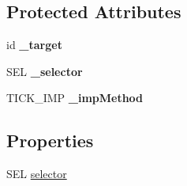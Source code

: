 \subsection*{Protected Attributes}
\begin{DoxyCompactItemize}
\item 
\hypertarget{interface_c_c_timer_target_selector_ad96cdf2fce395baef576a6b6d033f3f8}{id {\bfseries \-\_\-target}}\label{interface_c_c_timer_target_selector_ad96cdf2fce395baef576a6b6d033f3f8}

\item 
\hypertarget{interface_c_c_timer_target_selector_a9ae5a87769dd0d1e93f80404098da53e}{S\-E\-L {\bfseries \-\_\-selector}}\label{interface_c_c_timer_target_selector_a9ae5a87769dd0d1e93f80404098da53e}

\item 
\hypertarget{interface_c_c_timer_target_selector_a448237d83f297f2f808e3ebb805fdce0}{T\-I\-C\-K\-\_\-\-I\-M\-P {\bfseries \-\_\-imp\-Method}}\label{interface_c_c_timer_target_selector_a448237d83f297f2f808e3ebb805fdce0}

\end{DoxyCompactItemize}
\subsection*{Properties}
\begin{DoxyCompactItemize}
\item 
S\-E\-L \hyperlink{interface_c_c_timer_target_selector_ad90c489d1c74ca62925dcd5f5f5739a1}{selector}
\end{DoxyCompactItemize}


